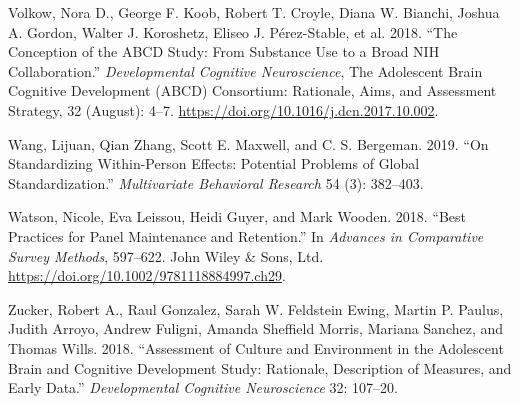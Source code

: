 \documentclass[
  letterpaper,
  DIV=11,
  numbers=noendperiod]{scrartcl}
\newlength{\cslhangindent}
\newlength{\cslentryspacingunit} %
\newenvironment{CSLReferences}[2] %
 {%
  \setlength{\parindent}{0pt}
  \ifodd #1
  \let\oldpar\par
  \def\par{\hangindent=\cslhangindent\oldpar}
  \fi
  \setlength{\parskip}{#2\cslentryspacingunit}
 }%
 {}
\begin{document}
\begin{CSLReferences}{1}{0}
\leavevmode{}%
Volkow, Nora D., George F. Koob, Robert T. Croyle, Diana W. Bianchi,
Joshua A. Gordon, Walter J. Koroshetz, Eliseo J. Pérez-Stable, et al.
2018. {``The Conception of the {ABCD} Study: {From} Substance Use to a
Broad {NIH} Collaboration.''} \emph{Developmental Cognitive
Neuroscience}, The {Adolescent} {Brain} {Cognitive} {Development}
({ABCD}) {Consortium}: {Rationale}, {Aims}, and {Assessment} {Strategy},
32 (August): 4--7. \url{https://doi.org/10.1016/j.dcn.2017.10.002}.

\leavevmode{}%
Wang, Lijuan, Qian Zhang, Scott E. Maxwell, and C. S. Bergeman. 2019.
{``On Standardizing Within-Person Effects: {Potential} Problems of
Global Standardization.''} \emph{Multivariate Behavioral Research} 54
(3): 382--403.

\leavevmode{}%
Watson, Nicole, Eva Leissou, Heidi Guyer, and Mark Wooden. 2018. {``Best
{Practices} for {Panel} {Maintenance} and {Retention}.''} In
\emph{Advances in {Comparative} {Survey} {Methods}}, 597--622. John
Wiley \& Sons, Ltd. \url{https://doi.org/10.1002/9781118884997.ch29}.

\leavevmode{}%
Zucker, Robert A., Raul Gonzalez, Sarah W. Feldstein Ewing, Martin P.
Paulus, Judith Arroyo, Andrew Fuligni, Amanda Sheffield Morris, Mariana
Sanchez, and Thomas Wills. 2018. {``Assessment of Culture and
Environment in the {Adolescent} {Brain} and {Cognitive} {Development}
{Study}: {Rationale}, Description of Measures, and Early Data.''}
\emph{Developmental Cognitive Neuroscience} 32: 107--20.

\end{CSLReferences}
\end{document}
